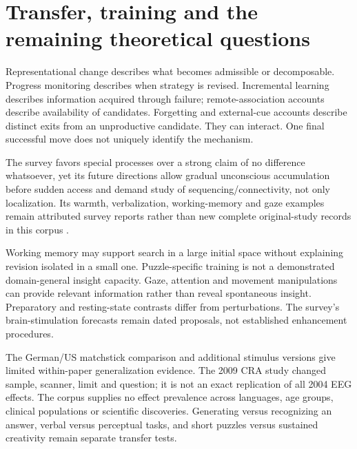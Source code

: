 \section{Transfer, training and the remaining theoretical questions}
\label{sec:p19-insight-alternatives}

Representational change describes what becomes admissible or decomposable.
Progress monitoring describes when strategy is revised.
Incremental learning describes information acquired through failure;
remote-association accounts describe availability of candidates.
Forgetting and external-cue accounts describe distinct exits from an
unproductive candidate. They can interact. One final successful move does
not uniquely identify the mechanism.

The survey favors special processes over a strong claim of no difference
whatsoever, yet its future directions allow gradual unconscious accumulation
before sudden access and demand study of sequencing/connectivity, not only
localization. Its warmth, verbalization, working-memory and gaze examples
remain attributed survey reports rather than new complete original-study
records in this corpus \parencite[pp.~478--483,486--488]{VanSteenburghEtAl2012InsightRevises}.

Working memory may support search in a large initial space without explaining
revision isolated in a small one. Puzzle-specific training is not a demonstrated
domain-general insight capacity. Gaze, attention and movement manipulations
can provide relevant information rather than reveal spontaneous insight.
Preparatory and resting-state contrasts differ from perturbations.
The survey's brain-stimulation forecasts remain dated proposals, not
established enhancement procedures.

The German/US matchstick comparison and additional stimulus versions give
limited within-paper generalization evidence.
The 2009 CRA study changed sample, scanner, limit and question; it is not an
exact replication of all 2004 EEG effects. The corpus supplies no effect prevalence
across languages, age groups, clinical populations or scientific discoveries.
Generating versus recognizing an answer, verbal versus perceptual tasks,
and short puzzles versus sustained creativity remain separate transfer tests.

